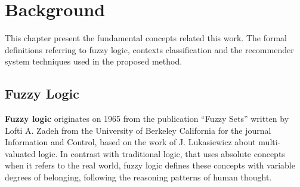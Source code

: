 
\chapter{Background}

This chapter present the fundamental concepts related this work. The formal
definitions referring to fuzzy logic, contexts classification and the
recommender system techniques used in the proposed method.

\section{Fuzzy Logic}

\textbf{Fuzzy logic} originates on 1965 from the publication “Fuzzy
Sets”\cite{zadeh1965fuzzy} written by Lofti A. Zadeh from the University of
Berkeley California for the journal Information and Control, based on
the work of J. Lukasiewicz\cite{saffiotti1995multivalued} about
multi-valuated logic. In contrast with traditional logic, that uses
absolute concepts when it refers to the real world, fuzzy logic
defines these concepts with variable degrees of belonging, following
the reasoning patterns of human thought. \\  

